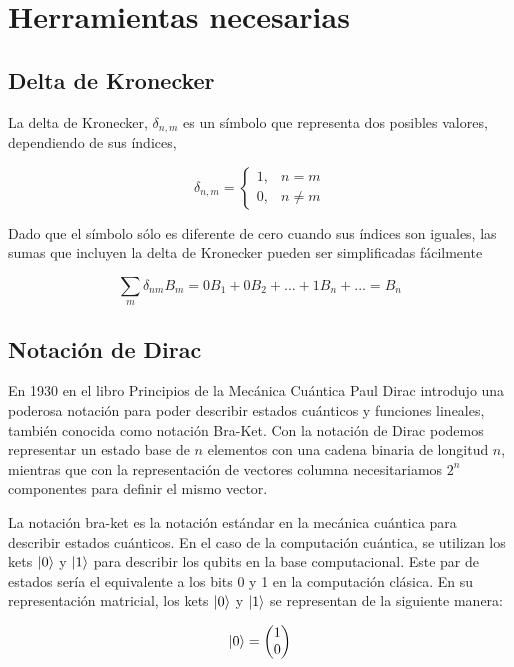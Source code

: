 \section{Herramientas necesarias}

\subsection{Delta de Kronecker}

La delta de Kronecker, $\delta_{n,m}$ es un símbolo que representa dos posibles valores, dependiendo de sus índices,

\begin{equation}
    \delta_{n,m} =
    \begin{cases}
        1, & n = m \\
        0, & n \neq m
    \end{cases}
\end{equation}

Dado que el símbolo sólo es diferente de cero cuando sus índices son iguales, las sumas que incluyen la delta de Kronecker pueden ser simplificadas fácilmente

\begin{equation*}
    \sum\limits_m \delta_{nm} B_m = 0 B_1 + 0 B_2 + ... + 1 B_n + ... = B_n
\end{equation*}

\subsection{Notación de Dirac}

En 1930 en el libro Principios de la Mecánica Cuántica Paul Dirac introdujo una poderosa notación para poder describir estados cuánticos y funciones lineales, también conocida como notación Bra-Ket. Con la notación de Dirac podemos representar un estado base de $n$ elementos con una cadena binaria de longitud $n$, mientras que con la representación de vectores columna necesitariamos $2^n$ componentes para definir el mismo vector.

La notación bra-ket es la notación estándar en la mecánica cuántica para describir estados cuánticos. En el caso de la computación cuántica, se utilizan los kets $\ket{0}$ y $\ket{1}$ para describir los qubits en la base computacional. Este par de estados sería el equivalente a los bits 0 y 1 en la computación clásica. En su representación matricial, los kets $\ket{0}$ y $\ket{1}$ se representan de la siguiente manera:

\[\ket{0} = \begin{pmatrix} 1 \\ 0 \end{pmatrix}\]

